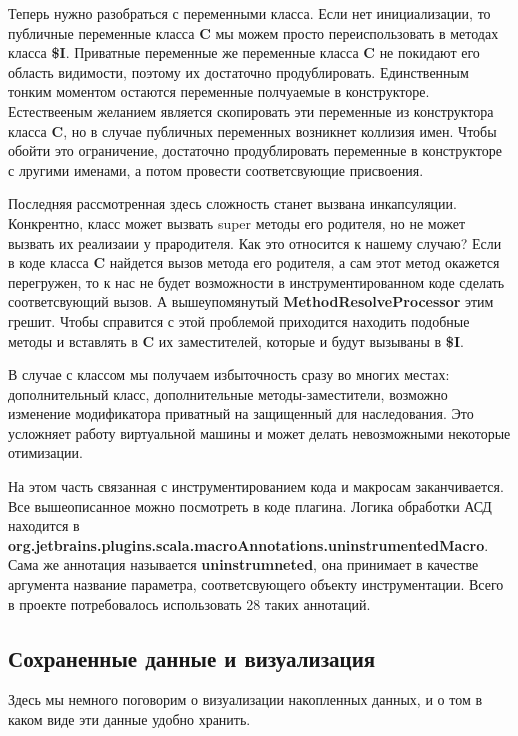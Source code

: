 Теперь нужно разобраться с переменными класса.
Если нет инициализации, то публичные переменные класса \textbf{C} мы можем
просто переиспользовать в методах класса \textbf{\$I}.
Приватные переменные же переменные класса \textbf{C} не покидают его область
видимости, поэтому их достаточно продублировать.
Единственным тонким моментом остаются переменные полчуаемые в конструкторе.
Естествееным желанием является скопировать эти переменные из конструктора
класса \textbf{C}, но в случае публичных переменных возникнет коллизия имен.
Чтобы обойти это ограничение, достаточно продублировать переменные в конструкторе
с лругими именами, а потом провести соответсвующие присвоения.

Последняя рассмотренная здесь сложность станет вызвана инкапсуляции.
Конкрентно, класс может вызвать super методы его родителя, но не может вызвать
их реализаии у прародителя.
Как это относится к нашему случаю?
Если в коде класса \textbf{C} найдется вызов метода его родителя,
а сам этот метод окажется перегружен, то к нас не будет возможности в
инструментированном коде сделать соответсвующий вызов.
А вышеупомянутый \textbf{MethodResolveProcessor} этим грешит.
Чтобы справится с этой проблемой приходится находить подобные методы и
вставлять в \textbf{C} их заместителей, которые и будут вызываны в \textbf{\$I}.

В случае с классом мы получаем избыточность сразу во многих местах:
дополнительный класс, дополнительные методы-заместители, возможно изменение
модификатора приватный на защищенный для наследования.
Это усложняет работу виртуальной машины и может делать невозможными некоторые
отимизации.

На этом часть связанная с инструментированием кода и макросам заканчивается.
Все вышеописанное можно посмотреть в коде плагина.
Логика обработки АСД находится в
\textbf{org.jetbrains.plugins.scala.macroAnnotations.uninstrumentedMacro}.
Сама же аннотация называется \textbf{uninstrumneted}, она принимает в качестве
аргумента название параметра, соответсвующего объекту инструментации.
Всего в проекте потребовалось использовать 28 таких аннотаций.

\subsection{Сохраненные данные и визуализация}
\label{sec:data}

Здесь мы немного поговорим о визуализации накопленных данных,
и о том в каком виде эти данные удобно хранить.
